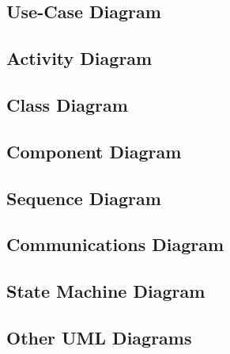 
\subsection{Use-Case Diagram}


\subsection{Activity Diagram}


\subsection{Class Diagram}


\subsection{Component Diagram}


\subsection{Sequence Diagram}


\subsection{Communications Diagram}


\subsection{State Machine Diagram}


\subsection{Other UML Diagrams}


